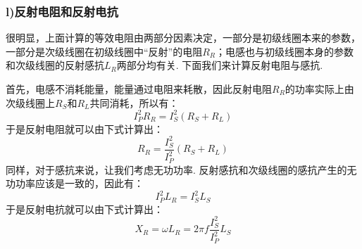 \documentclass[UTF8]{ctexart}
\begin{document}
\subsubsection*{l)反射电阻和反射电抗}
很明显，上面计算的等效电阻由两部分因素决定，一部分是初级线圈本来的参数，一部分是次级线圈在初级线圈中“反射”的电阻$R_R$；电感也与初级线圈本身的参数和次级线圈的反射感抗$L_R$两部分均有关. 下面我们来计算反射电阻与感抗.\par
首先，电感不消耗能量，能量通过电阻来耗散，因此反射电阻$R_R$的功率实际上由次级线圈上$R_S$和$R_L$共同消耗，所以有：
\begin{equation}
    I_P^2R_R=I_S^2(R_S+R_L)
    \label{ershiyi}
\end{equation}
于是反射电阻就可以由下式计算出：
\begin{equation}
    R_R=\frac{I_S^2}{I_P^2}(R_S+R_L)
\end{equation}
同样，对于感抗来说，让我们考虑无功功率. 反射感抗和次级线圈的感抗产生的无功功率应该是一致的，因此有：
\begin{equation}
    I_P^2L_R=I_S^2L_S
    \label{ershisan}
\end{equation}
于是反射电抗就可以由下式计算出：
\begin{equation}
    X_R=\omega L_R=2\pi f\frac{I_S^2}{I_P^2}L_S
\end{equation}
\end{document}
